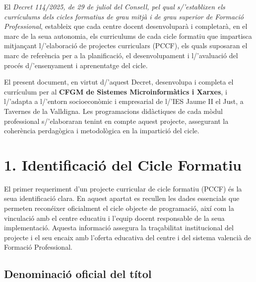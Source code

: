 \documentclass[
  paper=a4,
  ,captions=tableheading
]{scrartcl}
\begin{document}



\renewcommand*\contentsname{Índex}
{
\setcounter{tocdepth}{3}
\tableofcontents
\newpage
}
El \emph{Decret 114/2025, de 29 de juliol del Consell, pel qual
s/'establixen els currículums dels cicles formatius de grau mitjà i de
grau superior de Formació Professional}, estableix que cada centre
docent desenvoluparà i completarà, en el marc de la seua autonomia, els
curriculums de cada cicle formatiu que impartisca mitjançant
l/'elaboració de projectes curriculars (PCCF), els quals suposaran el
marc de referència per a la planificació, el desenvolupament i
l/'avaluació del procés d/'ensenyament i aprenentatge del cicle.

El present document, en virtut d/'aquest Decret, desenvolupa i completa
el currículum per al \textbf{CFGM de Sistemes Microinformàtics i
Xarxes}, i l/'adapta a l/'entorn socioeconòmic i empresarial de l/'IES
Jaume II el Just, a Tavernes de la Valldigna. Les programacions
didàctiques de cada mòdul professional s/'elaboraran tenint en compte
aquest projecte, assegurant la coherència perdagògica i metodològica en
la impartició del cicle.

\hypertarget{identificaciuxf3-del-cicle-formatiu}{%
\section{1. Identificació del Cicle
Formatiu}\label{identificaciuxf3-del-cicle-formatiu}}

El primer requeriment d'un projecte curricular de cicle formatiu (PCCF)
és la seua identificació clara. En aquest apartat es recullen les dades
essencials que permeten reconéixer oficialment el cicle objecte de
programació, així com la vinculació amb el centre educatiu i l'equip
docent responsable de la seua implementació. Aquesta informació assegura
la traçabilitat institucional del projecte i el seu encaix amb l'oferta
educativa del centre i del sistema valencià de Formació Professional.

\hypertarget{denominaciuxf3-oficial-del-tuxedtol}{%
\subsection{Denominació oficial del
títol}\label{denominaciuxf3-oficial-del-tuxedtol}}
\end{document}

